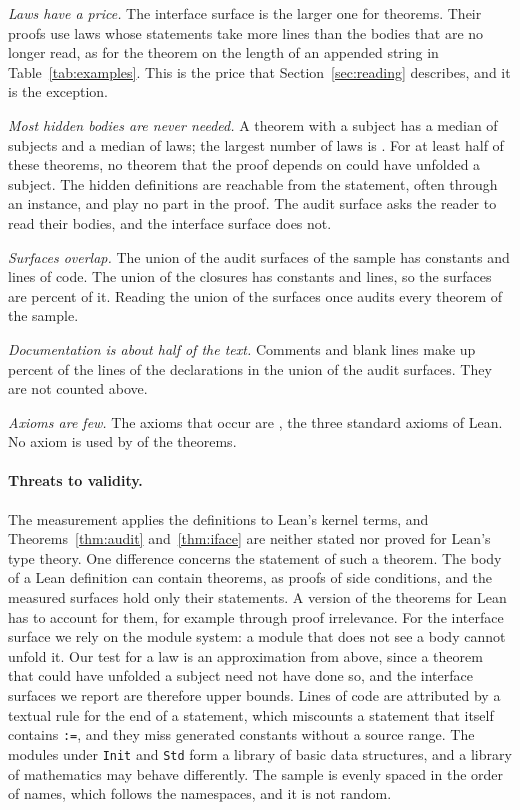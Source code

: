 \documentclass[acmsmall,nonacm,screen]{acmart}
\newcommand{\lean}[1]{\texttt{#1}}
\begin{document}
\emph{Laws have a price.} The interface surface is the larger one for \NumIfaceLarger{}
theorems. Their proofs use laws whose statements take more lines than the bodies that are no
longer read, as for the theorem on the length of an appended string in
Table~\ref{tab:examples}. This is the price that Section~\ref{sec:reading} describes, and it is
the exception.

\emph{Most hidden bodies are never needed.} A theorem with a subject has a median of
\SubjSubjectsMedian{} subjects and a median of \SubjLawsMedian{} laws; the largest number of
laws is \SubjLawsMax{}. For at least half of these theorems, no theorem that the proof depends
on could have unfolded a subject. The hidden definitions are reachable from the statement,
often through an instance, and play no part in the proof. The audit surface asks the reader to
read their bodies, and the interface surface does not.

\emph{Surfaces overlap.} The union of the audit surfaces of the sample has \UnionAuditConsts{}
constants and \UnionAuditLines{} lines of code. The union of the closures has
\UnionClosureConsts{} constants and \UnionClosureLines{} lines, so the surfaces are
\UnionAuditPercent{} percent of it. Reading the union of the surfaces once audits every theorem
of the sample.

\emph{Documentation is about half of the text.} Comments and blank lines make up
\CommentPercent{} percent of the lines of the declarations in the union of the audit surfaces.
They are not counted above.

\emph{Axioms are few.} The axioms that occur are \AxiomsUsed{}, the three standard axioms of
Lean. No axiom is used by \NumNoAxiom{} of the theorems.

\paragraph{Threats to validity.}
The measurement applies the definitions to Lean's kernel terms, and Theorems~\ref{thm:audit}
and~\ref{thm:iface} are neither stated nor proved for Lean's type theory. One difference
concerns the statement of such a theorem. The body of a Lean definition can contain theorems, as
proofs of side conditions, and the measured surfaces hold only their statements. A version of
the theorems for Lean has to account for them, for example through proof irrelevance. For the
interface surface we rely on the module system: a module that does not see a body cannot unfold
it. Our test for a law is an approximation from above, since a theorem that could have unfolded
a subject need not have done so, and the interface surfaces we report are therefore upper
bounds. Lines of code are attributed by a textual rule for the end of a statement, which
miscounts a statement that itself contains \lean{:=}, and they miss generated constants
without a source range. The modules under \lean{Init} and \lean{Std} form a library of basic
data structures, and a library of mathematics may behave differently. The sample is evenly
spaced in the order of names, which follows the namespaces, and it is not random.
\end{document}
